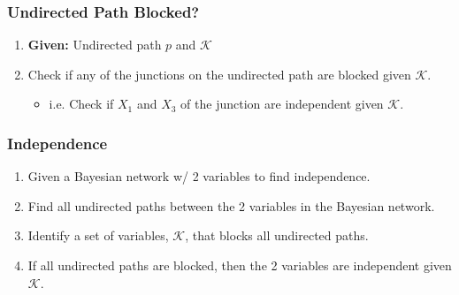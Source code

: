 \subsubsection{Undirected Path Blocked?}
\begin{process}
    \begin{enumerate}
        \item \textbf{Given:} Undirected path $p$ and $\mathcal{K}$
        \item Check if any of the junctions on the undirected path are blocked given $\mathcal{K}$.
        \begin{itemize}
            \item i.e. Check if $X_1$ and $X_3$ of the junction are independent given $\mathcal{K}$.
        \end{itemize}
    \end{enumerate}
\end{process}

\subsubsection{Independence}
\begin{process}
    \begin{enumerate}
        \item Given a Bayesian network w/ 2 variables to find independence.
        \item Find all undirected paths between the 2 variables in the Bayesian network.
        \item Identify a set of variables, $\mathcal{K}$, that blocks all undirected paths.
        \item If all undirected paths are blocked, then the 2 variables are independent given $\mathcal{K}$.
    \end{enumerate}
\end{process}

